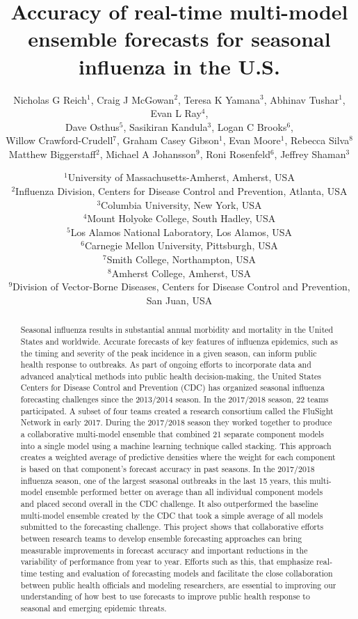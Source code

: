 \documentclass{article}\usepackage[]{graphicx}\usepackage[]{color}
\title{Accuracy of real-time multi-model ensemble forecasts for seasonal influenza in the U.S.}
\author{Nicholas G Reich$^1$, Craig J McGowan$^2$, Teresa K Yamana$^3$, Abhinav Tushar$^1$, Evan L Ray$^4$,\\
Dave Osthus$^5$, Sasikiran Kandula$^3$, Logan C Brooks$^6$,\\
Willow Crawford-Crudell$^7$, Graham Casey Gibson$^1$, Evan Moore$^1$, Rebecca Silva$^8$\\Matthew Biggerstaff$^2$, Michael A Johansson$^9$, Roni Rosenfeld$^6$, Jeffrey Shaman$^3$}
\date{%
    $^1$University of Massachusetts-Amherst, Amherst, USA\\%
    $^2$Influenza Division, Centers for Disease Control and Prevention, Atlanta, USA\\
    $^3$Columbia University, New York, USA\\
    $^4$Mount Holyoke College, South Hadley, USA\\
    $^5$Los Alamos National Laboratory, Los Alamos, USA\\
    $^6$Carnegie Mellon University, Pittsburgh, USA\\%
    $^7$Smith College, Northampton, USA\\
    $^8$Amherst College, Amherst, USA\\
    $^9$Division of Vector-Borne Diseases, Centers for Disease Control and Prevention, San Juan, USA\\
}
\begin{document}

\maketitle











\clearpage

\begin{abstract}
Seasonal influenza results in substantial annual morbidity and mortality in the United States and worldwide.
Accurate forecasts of key features of influenza epidemics, such as the timing and severity of the peak incidence in a given season, can inform public health response to outbreaks.
As part of ongoing efforts to incorporate data and advanced analytical methods into public health decision-making, the United States Centers for Disease Control and Prevention (CDC) has organized seasonal influenza forecasting challenges since the 2013/2014 season. 
In the 2017/2018 season, 22 teams participated. 
A subset of four teams created a research consortium called the FluSight Network in early 2017.
During the 2017/2018 season they worked together to produce a collaborative multi-model ensemble that combined 21 separate component models into a single model using a machine learning technique called stacking.
This approach creates a weighted average of predictive densities where the weight for each component is based on that component's forecast accuracy in past seasons.
In the 2017/2018 influenza season, one of the largest seasonal outbreaks in the last 15 years, this multi-model ensemble performed better on average than all individual component models and placed second overall in the CDC challenge.
It also outperformed the baseline multi-model ensemble created by the CDC that took a simple average of all models submitted to the forecasting challenge.
This project shows that collaborative efforts between research teams to develop ensemble forecasting approaches can bring measurable improvements in forecast accuracy and important reductions in the variability of performance from year to year.
Efforts such as this, that emphasize real-time testing and evaluation of forecasting models and facilitate the close collaboration between public health officials and modeling researchers, are essential to improving our understanding of how best to use forecasts to improve public health response to seasonal and emerging epidemic threats.
\end{abstract}
\end{document}
